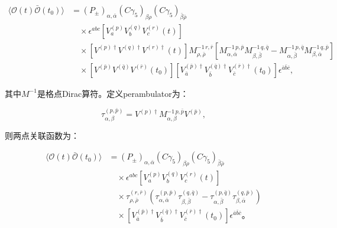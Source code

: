 \documentclass[12pt,a4paper]{ctexart}
\theoremstyle{definition}
\begin{document}
\begin{equation}
\begin{aligned}
\langle \mathcal{O}(t) \bar{\mathcal{O}}(t_0) \rangle &= (P_\pm)_{\alpha,\bar{\alpha}} (C\gamma_5)_{\beta\rho} (C\gamma_5)_{\bar{\beta}\bar{\rho}} \\
&\quad \times \epsilon^{abc} \left[ V^{(p)}_a V^{(q)}_b V^{(r)}_c (t) \right] \\
&\quad \times \left[ V^{(p)\dagger} V^{(q)\dagger} V^{(r)\dagger} (t) \right] M^{-1\, r,\bar{r}}_{\rho,\bar{\rho}} \left[ M^{-1\, p,\bar{p}}_{\alpha,\bar{\alpha}} M^{-1\, q,\bar{q}}_{\beta,\bar{\beta}} - M^{-1\, p,\bar{q}}_{\alpha,\bar{\beta}} M^{-1\, q,\bar{p}}_{\beta,\bar{\alpha}} \right] \\
&\quad \times \left[ V^{(\bar{p})} V^{(\bar{q})} V^{(\bar{r})} (t_0) \right] \left[ V^{(\bar{p})\dagger}_{\bar{a}} V^{(\bar{q})\dagger}_{\bar{b}} V^{(\bar{r})\dagger}_{\bar{c}} (t_0) \right] \epsilon^{\bar{a}\bar{b}\bar{c}},
\end{aligned}
\label{eq:2pt_full}
\end{equation}

其中$M^{-1}$是格点Dirac算符。定义perambulator为：

\begin{equation}
\tau^{(p,\bar{p})}_{\alpha,\beta} = V^{(p)\dagger} M^{-1\, p,\bar{p}}_{\alpha,\beta} V^{(\bar{p})},
\label{eq:perambulator}
\end{equation}

则两点关联函数为：

\begin{equation}
\begin{aligned}
\langle \mathcal{O}(t) \bar{\mathcal{O}}(t_0) \rangle &= (P_\pm)_{\alpha,\bar{\alpha}} (C\gamma_5)_{\beta\rho} (C\gamma_5)_{\bar{\beta}\bar{\rho}} \\
&\quad \times \epsilon^{abc} \left[ V^{(p)}_a V^{(q)}_b V^{(r)}_c (t) \right] \\
&\quad \times \tau^{(r,\bar{r})}_{\rho,\bar{\rho}} \left( \tau^{(p,\bar{p})}_{\alpha,\bar{\alpha}} \tau^{(q,\bar{q})}_{\beta,\bar{\beta}} - \tau^{(p,\bar{q})}_{\alpha,\bar{\beta}} \tau^{(q,\bar{p})}_{\beta,\bar{\alpha}} \right) \\
&\quad \times \left[ V^{(\bar{p})\dagger}_{\bar{a}} V^{(\bar{q})\dagger}_{\bar{b}} V^{(\bar{r})\dagger}_{\bar{c}} (t_0) \right] \epsilon^{\bar{a}\bar{b}\bar{c}}。
\end{aligned}
\label{eq:2pt_perambulator}
\end{equation}
\end{document}
